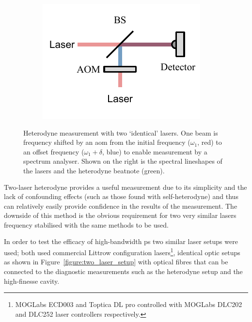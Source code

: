 \begin{figure}
    \begin{subfigure}{0.49\linewidth}
    \includegraphics{part1/Figs/HeterodyneTwoLasers.pdf}
    \end{subfigure}
    \begin{subfigure}{0.49\linewidth}
    
    \end{subfigure}
    \caption{Heterodyne measurement with two `identical' lasers. One beam is frequency shifted by an \gls{aom} from the initial frequency ($\omega_1$, red) to an offset frequency ($\omega_1+\delta$, blue) to enable measurement by a spectrum analyser. Shown on the right is the spectral lineshapes of the lasers and the heterodyne beatnote (green).}
    \label{figure:two-laser_heterodyne}
\end{figure}

Two-laser heterodyne provides a useful measurement due to its simplicity and the lack of confounding effects (such as those found with self-heterodyne) and thus can relatively easily provide confidence in the results of the measurement.
The downside of this method is the obvious requirement for two very similar lasers frequency stabilised with the same methods to be used.

In order to test the efficacy of high-bandwidth \gls{ps} two similar laser setups were used; both used commercial Littrow configuration lasers\footnote{MOGLabs ECD003 and Toptica DL pro controlled with MOGLabs DLC202 and DLC252 laser controllers respectively.}, identical optic setups as shown in Figure~\ref{figure:two_laser_setup} with optical fibres that can be connected to the diagnostic measurements such as the heterodyne setup and the high-finesse cavity.

